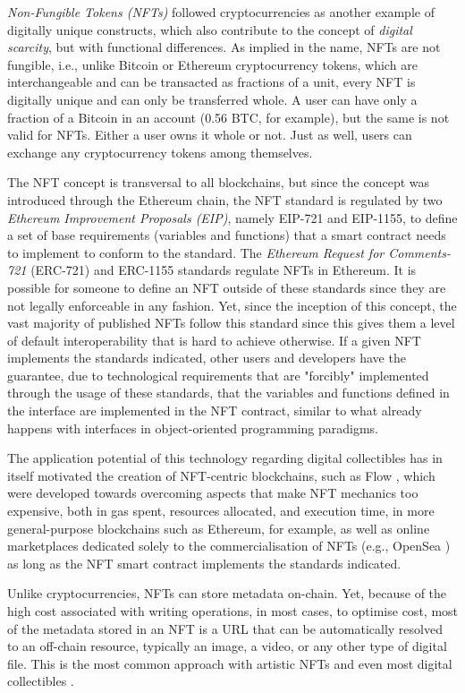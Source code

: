 \documentclass[../3_VotingAndNFTs.tex]{subfiles}
\begin{document}
\textit{Non-Fungible Tokens (NFTs)} followed cryptocurrencies as another example of digitally unique constructs, which also contribute to the concept of \textit{digital scarcity}, but with functional differences. As implied in the name, NFTs are not fungible, i.e., unlike Bitcoin or Ethereum cryptocurrency tokens, which are interchangeable and can be transacted as fractions of a unit, every NFT is digitally unique and can only be transferred whole. A user can have only a fraction of a Bitcoin in an account (0.56 BTC, for example), but the same is not valid for NFTs. Either a user owns it whole or not. Just as well, users can exchange any cryptocurrency tokens among themselves.
\par
The NFT concept is transversal to all blockchains, but since the concept was introduced through the Ethereum chain, the NFT standard is regulated by two \textit{Ethereum Improvement Proposals (EIP)}, namely EIP-721 and EIP-1155, to define a set of base requirements (variables and functions) that a smart contract needs to implement to conform to the standard. The \textit{Ethereum Request for Comments-721} (ERC-721) \cite{ERC721} and ERC-1155 \cite{ERC1155} standards regulate NFTs in Ethereum. It is possible for someone to define an NFT outside of these standards since they are not legally enforceable in any fashion. Yet, since the inception of this concept, the vast majority of published NFTs follow this standard since this gives them a level of default interoperability that is hard to achieve otherwise. If a given NFT implements the standards indicated, other users and developers have the guarantee, due to technological requirements that are "forcibly" implemented through the usage of these standards, that the variables and functions defined in the interface are implemented in the NFT contract, similar to what already happens with interfaces in object-oriented programming paradigms.
\par
The application potential of this technology regarding digital collectibles has in itself motivated the creation of NFT-centric blockchains, such as Flow \cite{Hentschel2019a}, which were developed towards overcoming aspects that make NFT mechanics too expensive, both in gas spent, resources allocated, and execution time, in more general-purpose blockchains such as Ethereum, for example, as well as online marketplaces dedicated solely to the commercialisation of NFTs (e.g., OpenSea \cite{OpenSea2024}) as long as the NFT smart contract implements the standards indicated.
\par
Unlike cryptocurrencies, NFTs can store metadata on-chain. Yet, because of the high cost associated with writing operations, in most cases, to optimise cost, most of the metadata stored in an NFT is a URL that can be automatically resolved to an off-chain resource, typically an image, a video, or any other type of digital file. This is the most common approach with artistic NFTs and even most digital collectibles \cite{Trautman2022}.
\end{document}
